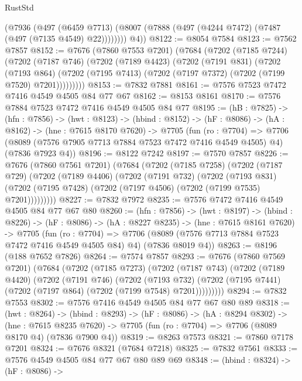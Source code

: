 \begin{lexlean}{RustStd}
\begin{coremodule}
          (@7936
            (@497
              (@6459 @7713)
              (@8007 (@7888 (@497 (@4244 @7472) (@7487 (@497 (@7135 @4549) @22))))))))
        @4))
@8122 := @8054 @7584
@8123 := @7562 @7857
@8152 := @7676
    (@7860 @7553 @7201)
    (@7684
      (@7202
        (@7185 @7244)
        (@7202
          (@7187 @746)
          (@7202
            (@7189 @4423)
            (@7202
              (@7191 @831)
              (@7202
                (@7193 @864)
                (@7202 (@7195 @7413) (@7202 (@7197 @7372) (@7202 (@7199 @7520) @7201)))))))))
@8153 := @7832 @7881
@8161 := @7576 @7523 @7472 @7416 @4549 @4505 @84 @77 @67
@8162 := @8153 @8161
@8170 := @7576 @7884 @7523 @7472 @7416 @4549 @4505 @84 @77
@8195 := (hB : @7825) ->
  (hfn : @7856) ->
  (hwt : @8123) ->
  (hbind : @8152) ->
  (hF : @8086) ->
  (hA : @8162) ->
  (hne : @7615 @8170 @7620) ->
  @7705
    (fun (ro : @7704) =>
    @7706 (@8089 (@7576 @7905 @7713 @7884 @7523 @7472 @7416 @4549 @4505) @4) (@7836 @7923 @4))
@8196 := @8122 @7242
@8197 := @7570 @7857
@8226 := @7676
    (@7860 @7561 @7201)
    (@7684
      (@7202
        (@7185 @7258)
        (@7202
          (@7187 @729)
          (@7202
            (@7189 @4406)
            (@7202
              (@7191 @732)
              (@7202
                (@7193 @831)
                (@7202 (@7195 @7428) (@7202 (@7197 @4506) (@7202 (@7199 @7535) @7201)))))))))
@8227 := @7832 @7972
@8235 := @7576 @7472 @7416 @4549 @4505 @84 @77 @67 @80
@8260 := (hfn : @7856) ->
  (hwt : @8197) ->
  (hbind : @8226) ->
  (hF : @8086) ->
  (hA : @8227 @8235) ->
  (hne : @7615 @8161 @7620) ->
  @7705
    (fun (ro : @7704) =>
    @7706 (@8089 (@7576 @7713 @7884 @7523 @7472 @7416 @4549 @4505 @84) @4) (@7836 @8019 @4))
@8263 := @8196 (@188 @7652 @7826)
@8264 := @7574 @7857
@8293 := @7676
    (@7860 @7569 @7201)
    (@7684
      (@7202
        (@7185 @7273)
        (@7202
          (@7187 @743)
          (@7202
            (@7189 @4420)
            (@7202
              (@7191 @746)
              (@7202
                (@7193 @732)
                (@7202 (@7195 @7441) (@7202 (@7197 @864) (@7202 (@7199 @7548) @7201)))))))))
@8294 := @7832 @7553
@8302 := @7576 @7416 @4549 @4505 @84 @77 @67 @80 @89
@8318 := (hwt : @8264) ->
  (hbind : @8293) ->
  (hF : @8086) ->
  (hA : @8294 @8302) ->
  (hne : @7615 @8235 @7620) -> @7705 (fun (ro : @7704) => @7706 (@8089 @8170 @4) (@7836 @7900 @4))
@8319 := @8263 @7573
@8321 := @7860 @7178 @7201
@8324 := @7676 @8321 (@7684 @7218)
@8325 := @7832 @7561
@8333 := @7576 @4549 @4505 @84 @77 @67 @80 @89 @69
@8348 := (hbind : @8324) ->
  (hF : @8086) ->

\end{coremodule}
\end{lexlean}
